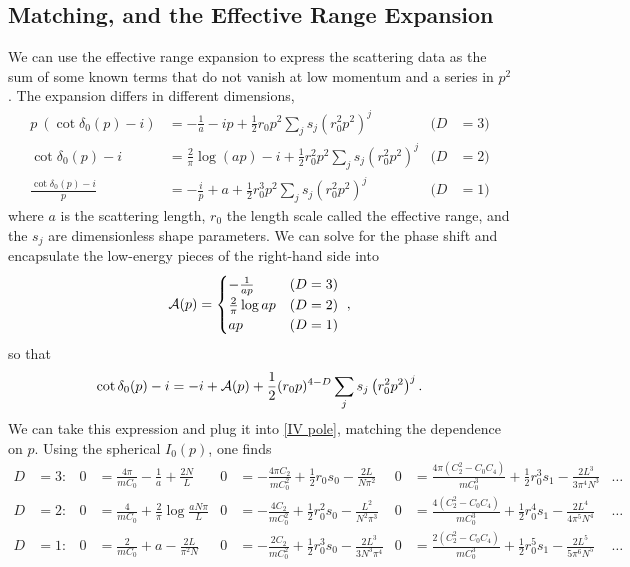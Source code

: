 \subsection{Matching, and the Effective Range Expansion}\label{sec:ere}

We can use the effective range expansion to express the scattering data as the sum of some known terms that do not vanish at low momentum and a series in $p^2$.  The expansion differs in different dimensions,
\begin{align}
    p\ (\cot \delta_0(p) - i)
    &=
    -\frac{1}{a} - ip + \frac{1}{2} r_0 p^2 \sum_j s_j (r_0^2 p^2)^j
    &
    (D&=3)
    \nonumber\\
    \cot \delta_0(p) - i
    &=
    \frac{2}{\pi} \log(a p) -i + \frac{1}{2} r_0^2 p^2 \sum_j s_j (r_0^2 p^2)^j
    &
    (D&=2)
    \\\nonumber
    \frac{\cot\delta_0(p)-i}{p}
    &=
    -\frac{i}{p} + a + \frac{1}{2} r_0^3 p^2 \sum_j s_j( r_0^2 p^2)^j
    &
    (D&=1)
\end{align}
where $a$ is the scattering length, $r_0$ the length scale called the effective range, and the $s_j$ are dimensionless shape parameters.
We can solve for the phase shift and encapsulate the low-energy pieces of the right-hand side into
\begin{equation}
    \mathcal{A}(p) =
    \begin{cases}
        -\frac{1}{ap}           &   (D=3)\\
        \frac{2}{\pi} \log ap   &   (D=2)\\
        ap                      &   (D=1)
    \end{cases}\ ,
\end{equation}
so that
\begin{equation}\label{eq:ERE}
    \cot \delta_0(p) - i = -i + \mathcal{A}(p) + \frac{1}{2} (r_0 p)^{4-D} \sum_j s_j \left(r_0^2p^2\right)^j.
\end{equation}
We can take this expression and plug it into \eqref{IV pole}, matching the dependence on $p$.
Using the spherical $I_0(p)$, one finds
\begin{align}
    \nonumber
    D&=3:
    &
    0&=\frac{4 \pi}{m C_0}-\frac{1}{a} + \frac{2N}{L}
    &
    0&=- \frac{4 \pi C_2}{m C_0^2} + \frac{1}{2}r_0 s_0 - \frac{2 L}{N \pi^2}
    &
    0&=\frac{4\pi(C_2^2-C_0 C_4)}{m C_0^3} + \frac{1}{2} r_0^3 s_1 - \frac{2L^3}{3\pi^4 N^3}
    &\ldots&
    \\
    D&=2:
    &
    0&=\frac{4}{m C_0} + \frac{2}{\pi} \log \frac{a N \pi}{L}
    &
    0&=- \frac{4 C_2}{m C_0^2} + \frac{1}{2}r_0^2 s_0  - \frac{L^2}{N^2 \pi^3}
    &
    0&=\frac{4(C_2^2-C_0 C_4)}{m C_0^3} + \frac{1}{2} r_0^4 s_1 - \frac{2 L^4}{4\pi^5 N^4}
    &\ldots&
    \\
    D&=1:
    &
    0&=\frac{2}{m C_0}+a-\frac{2L}{\pi^2N}
    &
    0&=- \frac{2 C_2}{m C_0^2} + \frac{1}{2}r_0^3 s_0 - \frac{2 L^3}{3N^3 \pi^4}
    &
    0&=\frac{2(C_2^2-C_0 C_4)}{m C_0^3} + \frac{1}{2} r_0^5 s_1 - \frac{2 L^5}{5\pi^6 N^5 }
    &\ldots&
    \nonumber
\end{align}
